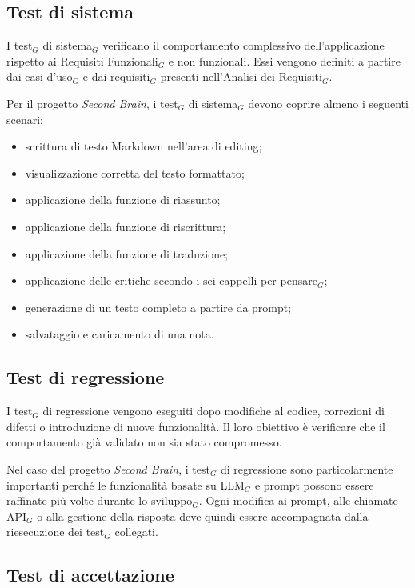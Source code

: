 \documentclass[a4paper, 10pt, colorlinks=true, linkcolor=black, urlcolor=blue, citecolor=blue, hidelinks]{article}
\begin{document}
\subsection{Test di sistema}

I test$_G$ di sistema$_G$ verificano il comportamento complessivo dell'applicazione rispetto ai Requisiti Funzionali$_G$ e non funzionali. Essi vengono definiti a partire dai casi d'uso$_G$ e dai requisiti$_G$ presenti nell'Analisi dei Requisiti$_G$.

Per il progetto \textit{Second Brain}, i test$_G$ di sistema$_G$ devono coprire almeno i seguenti scenari:
\begin{itemize}
    \item scrittura di testo Markdown nell'area di editing;
    \item visualizzazione corretta del testo formattato;
    \item applicazione della funzione di riassunto;
    \item applicazione della funzione di riscrittura;
    \item applicazione della funzione di traduzione;
    \item applicazione delle critiche secondo i sei cappelli per pensare$_G$;
    \item generazione di un testo completo a partire da prompt;
    \item salvataggio e caricamento di una nota.
\end{itemize}

\subsection{Test di regressione}

I test$_G$ di regressione vengono eseguiti dopo modifiche al codice, correzioni di difetti o introduzione di nuove funzionalità. Il loro obiettivo è verificare che il comportamento già validato non sia stato compromesso.

Nel caso del progetto \textit{Second Brain}, i test$_G$ di regressione sono particolarmente importanti perché le funzionalità basate su LLM$_G$ e prompt possono essere raffinate più volte durante lo sviluppo$_G$. Ogni modifica ai prompt, alle chiamate API$_G$ o alla gestione della risposta deve quindi essere accompagnata dalla riesecuzione dei test$_G$ collegati.

\subsection{Test di accettazione}
\end{document}
